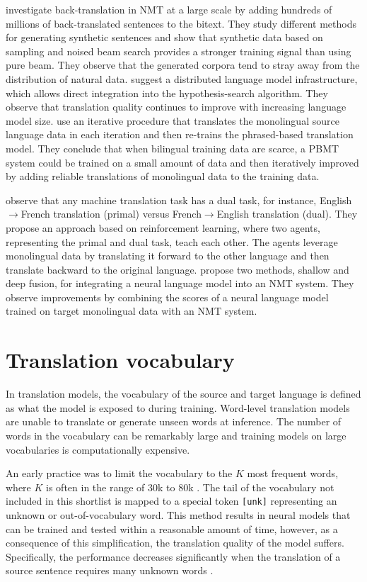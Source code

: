 \citet{edunov-etal-2018-understanding} investigate back-translation in NMT at a large scale by adding hundreds of millions of back-translated sentences to the bitext.
They study different methods for generating synthetic sentences and show that synthetic data based on sampling and noised beam search provides a stronger training signal than using pure beam.
They observe that the generated corpora tend to stray away from the distribution of natural data.
\citet{brants-etal-2007-large} suggest a distributed language model infrastructure, which allows direct integration into the hypothesis-search algorithm.  
They observe that translation quality continues to improve with increasing language model size.
\citet{Ueffing2007} use an iterative procedure that translates the monolingual source language data in each iteration and then re-trains the phrased-based translation model.
They conclude that when bilingual training data are scarce, a PBMT system could be trained on a small amount of data and then iteratively improved by adding reliable translations of monolingual data to the training data. 

\citet{NIPS2016_6469} observe that any machine translation task has a dual task, for instance, English$\rightarrow$French translation (primal) versus French$\rightarrow$English translation (dual). 
They propose an approach based on reinforcement learning, where two agents, representing the primal and dual task, teach each other. 
The agents leverage monolingual data by translating it forward to the other language and then translate backward to the original language.
\citet{gulcehre2017integrating} propose two methods, shallow and deep fusion, for integrating a neural language model into an NMT system.
They observe improvements by combining the scores of a neural language model trained on target monolingual data with an NMT system.


\section{Translation vocabulary} \label{bgvocab}

In translation models, the vocabulary of the source and target language is defined as what the model is exposed to during training. 
Word-level translation models are unable to translate or generate unseen words at inference.
The number of words in the vocabulary can be remarkably large and training models on large vocabularies is computationally expensive.  

An early practice was to limit the vocabulary to the $K$ most frequent words, where $K$ is often in the range of 30k \citep{DBLP:journals/corr/BahdanauCB14} to 80k \citep{sutskever2014sequence}.
The tail of the vocabulary not included in this shortlist is mapped to a special token \texttt{[unk]} representing an unknown or out-of-vocabulary word.
This method results in neural models that can be trained and tested within a reasonable amount of time, however, as a consequence of this simplification, the translation quality of the model suffers. 
Specifically, the performance decreases significantly when the translation of a source sentence requires many unknown words \citep{cho2014properties}.

